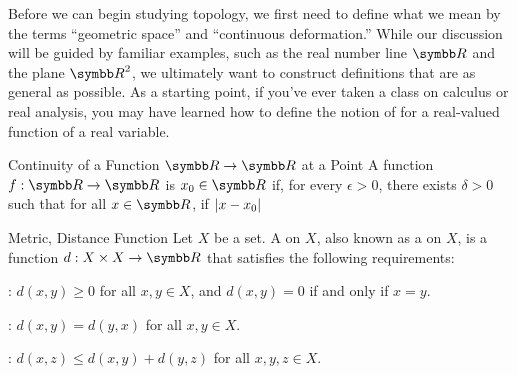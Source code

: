 \documentclass[12pt]{article}
\begin{document}
Before we can begin studying topology, we first need to define what we mean by the terms ``geometric space'' and ``continuous deformation.'' While our discussion will be guided by familiar examples, such as the real number line $\R$ and the plane $\R^2$, we ultimately want to construct definitions that are as general as possible. As a starting point, if you've ever taken a class on calculus or real analysis, you may have learned how to define the notion of  for a real-valued function of a real variable.

\begin{dfnbox}{Continuity of a Function $\R \to \R$ at a Point}
	A function $f: \R \to \R$ is  $x_0 \in \R$ if, for every $\epsilon > 0$, there exists $\delta > 0$ such that for all $x \in \R$, if ${\left\lvert {x - x_0} \right\rvert}$
\end{dfnbox}

\begin{dfnbox}{Metric, Distance Function}
	Let $X$ be a set. A  on $X$, also known as a  on $X$, is a function $d: X \times X \to \R$ that satisfies the following requirements:
	\begin{boxitems}
		\item {}: $d(x, y) \ge 0$ for all $x, y \in X$, and $d(x, y) = 0$ if and only if $x = y$.
		\item {}: $d(x, y) = d(y, x)$ for all $x, y \in X$.
		\item {}: $d(x, z) \le d(x, y) + d(y, z)$ for all $x, y, z \in X$.
	\end{boxitems}
\end{dfnbox}
\end{document}
